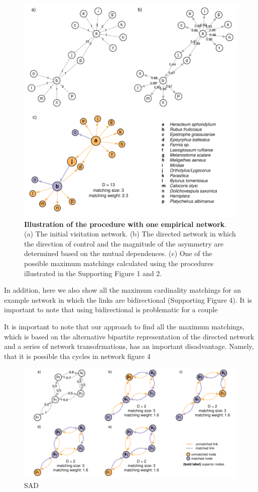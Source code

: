 \documentclass[a4paper]{artikel1}
\begin{document}
\begin{figure}[htbp]
\centering
\includegraphics{supp_info_2_files/figure-latex/fig-SA_exp-1.pdf}
\caption{\textbf{Illustration of the procedure with one empirical
network}. (a) The initial visitation network. (b) The directed network
in which the direction of control and the magnitude of the asymmetry are
determined based on the mutual dependences. (c) One of the possible
maximum matchings calculated using the procedures illustrated in the
Supporting Figure 1 and 2.}
\end{figure}

In addition, here we also show all the maximum cardinality matchings for
an example network in which the links are bidirectional (Supporting
Figure 4). It is important to note that using bidirectional is
problematic for a couple

It is important to note that our approach to find all the maximum
matchings, which is based on the alternative bipartite representation of
the directed network and a series of network transofrmations, has an
important disadvantage. Namely, that it is possible tha cycles in
network figure 4

\begin{figure}[htbp]
\centering
\includegraphics{supp_info_2_files/figure-latex/fig-matchings-bidirectional-1.pdf}
\caption{SAD}
\end{figure}
\end{document}

